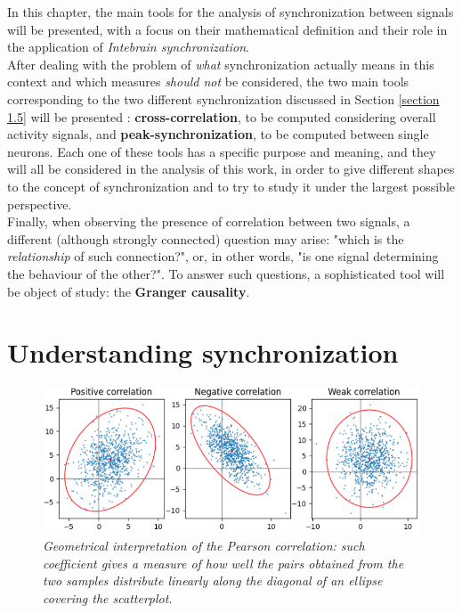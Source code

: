 \documentclass[12pt, a4paper]{report}
\begin{document}
In this chapter, the main tools for the analysis of synchronization between signals will be presented, with a focus on their mathematical definition and their role in the application of \textit{Intebrain synchronization}.\\
After dealing with the problem of \textit{what} synchronization actually means in this context and which measures \textit{should not} be considered, the two main tools corresponding to the two different synchronization discussed in Section \ref{section 1.5} will be presented :\textbf{ cross-correlation}, to be computed considering overall activity signals, and \textbf{peak-synchronization}, to be computed between single neurons. Each one of these tools has a specific purpose and meaning, and they will all be considered in the analysis of this work, in order to give different shapes to the concept of synchronization and to try to study it under the largest possible perspective.\\
Finally, when observing the presence of correlation between two signals, a different (although strongly connected) question may arise: "which is the \textit{relationship} of such connection?", or, in other words, "is one signal determining the behaviour of the other?". To answer such questions, a sophisticated tool will be object of study: the \textbf{Granger causality}.


\section{Understanding synchronization}

\begin{figure}[H]
	\begin{center}
		\includegraphics[scale=.75]{pearson.png} 
	\end{center} 
	\caption{\textit{Geometrical interpretation of the Pearson correlation: such coefficient gives a measure of how well the pairs obtained from the two samples distribute linearly along the diagonal of an ellipse covering the scatterplot. \cite{46}}}
	
\end{figure}
\end{document}
